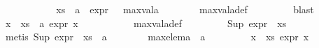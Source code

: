 \begin{isabellebody}
\ \ \ \ \isamarkupfalse%
\ {}\ \isamarkupfalse%
\ {\isachardoublequoteopen}{\isacharparenleft}{\kern0pt}{\isasymexists}{\isasympsi}{\isachardot}{\kern0pt}\ {\isasympsi}\ {\isasymin}\ xs\ {\isasymunion}\ {\isacharbraceleft}{\kern0pt}a{\isacharbraceright}{\kern0pt}\ {\isasymand}\ expr{\isacharunderscore}{\kern0pt}{}\ {\isasympsi}\ {\isacharequal}{\kern0pt}\ max{\isacharunderscore}{\kern0pt}val{\isacharunderscore}{\kern0pt}a{\isacharparenright}{\kern0pt}{\isachardoublequoteclose}\isanewline
\ \ \ \ \ \ \isamarkupfalse%
\ max{\isacharunderscore}{\kern0pt}val{\isacharunderscore}{\kern0pt}a{\isacharunderscore}{\kern0pt}def\ \isanewline
\ \ \ \ \ \ \isamarkupfalse%
\ blast\isanewline
\ \ \ \ \isamarkupfalse%
\ {}\ \isamarkupfalse%
\ {\isachardoublequoteopen}{\isasymexists}x\ {\isasymin}\ {\isacharparenleft}{\kern0pt}xs\ {\isasymunion}\ {\isacharbraceleft}{\kern0pt}a{\isacharbraceright}{\kern0pt}{\isacharparenright}{\kern0pt}{\isachardot}{\kern0pt}\ expr{\isacharunderscore}{\kern0pt}{}\ x\ {\isacharequal}{\kern0pt}\ {\isasyminfinity}{\isachardoublequoteclose}\ \isanewline
\ \ \ \ \ \ \isamarkupfalse%
\ max{\isacharunderscore}{\kern0pt}val{\isacharunderscore}{\kern0pt}a{\isacharunderscore}{\kern0pt}def\ \isanewline
\ \ \ \ \ \ \isamarkupfalse%
\ {\isacartoucheopen}Sup\ {\isacharparenleft}{\kern0pt}expr{\isacharunderscore}{\kern0pt}{}\ {\isacharbackquote}{\kern0pt}\ xs{\isacharparenright}{\kern0pt}\ {\isacharequal}{\kern0pt}\ {\isasyminfinity}{\isacartoucheclose}\ \isanewline
\ \ \ \ \ \ \isamarkupfalse%
\ {\isacharparenleft}{\kern0pt}metis\ {\isacartoucheopen}Sup\ {\isacharparenleft}{\kern0pt}expr{\isacharunderscore}{\kern0pt}{}\ {\isacharbackquote}{\kern0pt}\ {\isacharparenleft}{\kern0pt}xs\ {\isasymunion}\ {\isacharbraceleft}{\kern0pt}a{\isacharbraceright}{\kern0pt}{\isacharparenright}{\kern0pt}{\isacharparenright}{\kern0pt}\ {\isacharequal}{\kern0pt}\ {\isasyminfinity}{\isacartoucheclose}{\isacharparenright}{\kern0pt}\isanewline
\ \ \ \ \isamarkupfalse%
\ {\isachardoublequoteopen}max{\isacharunderscore}{\kern0pt}elem{\isacharunderscore}{\kern0pt}a\ {\isacharequal}{\kern0pt}\ a{\isachardoublequoteclose}\isanewline
\ \ \ \ \ \ \isamarkupfalse%
\ {}\ {\isacartoucheopen}{\isasymforall}x\ {\isasymin}\ xs{\isachardot}{\kern0pt}\ expr{\isacharunderscore}{\kern0pt}{}\ x\ {\isacharless}{\kern0pt}\ {\isasyminfinity}{\isacartoucheclose}\isanewline

\end{isabellebody}
